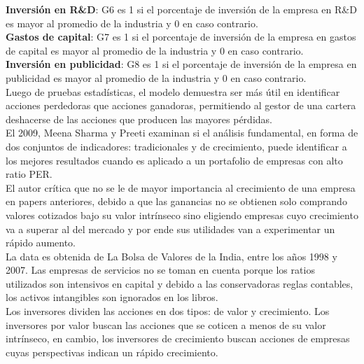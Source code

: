 \textbf{Inversión en R\&D}: G6 es 1 si el porcentaje de inversión de la empresa en R\&D es mayor al promedio de la industria y 0 en caso contrario.\\

\textbf{Gastos de capital}: G7 es 1 si el porcentaje de inversión de la empresa en gastos de capital es mayor al promedio de la industria y 0 en caso contrario.\\

\textbf{Inversión en publicidad}: G8 es 1 si el porcentaje de inversión de la empresa en publicidad es mayor al promedio de la industria y 0 en caso contrario.\\

Luego de pruebas estadísticas, el modelo demuestra ser más útil en identificar acciones perdedoras que acciones ganadoras, permitiendo al gestor de una cartera deshacerse de las acciones que producen las mayores pérdidas.\\


El 2009, Meena Sharma y Preeti \cite{Preeti2009} examinan si el análisis fundamental, en forma de dos conjuntos de indicadores: tradicionales y de crecimiento, puede identificar a los mejores resultados cuando es aplicado a un portafolio de empresas con alto ratio PER.\\

El autor crítica que no se le de mayor importancia al crecimiento de una empresa en papers anteriores, debido a que las ganancias no se obtienen solo comprando valores cotizados bajo su valor intrínseco sino eligiendo empresas cuyo crecimiento va a superar al del mercado y por ende sus utilidades van a experimentar un rápido aumento.\\

La data es obtenida de La Bolsa de Valores de la India, entre los años 1998 y 2007. Las empresas de servicios no se toman en cuenta porque los ratios utilizados son intensivos en capital y debido a las conservadoras reglas contables, los activos intangibles son ignorados en los libros.\\

Los inversores dividen las acciones en dos tipos: de valor y crecimiento. Los inversores por valor buscan las acciones que se coticen a menos de su valor intrínseco, en cambio, los inversores de crecimiento buscan acciones de empresas cuyas perspectivas indican un rápido crecimiento.\\

